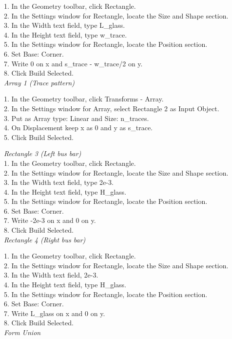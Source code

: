 1. In the Geometry toolbar, click Rectangle.\\
2. In the Settings window for Rectangle, locate the Size and Shape section.\\
3. In the Width text field, type L\_glass.\\
4. In the Height text field, type w\_trace.\\
5. In the Settings window for Rectangle, locate the Position section.\\
6. Set Base: Corner.\\
7. Write 0 on x and s\_trace - w\_trace/2 on y.\\
8. Click Build Selected.
\\
\textit{Array 1 (Trace pattern)}

1. In the Geometry toolbar, click Transforms - Array.\\
2. In the Settings window for Array, select Rectangle 2 as Input Object.\\
3. Put as Array type: Linear and Size: n\_traces.\\
4. On Displacement keep x as 0 and y as s\_trace.\\
5. Click Build Selected.

\textit{Rectangle 3 (Left bus bar)}
\\
1. In the Geometry toolbar, click Rectangle.\\
2. In the Settings window for Rectangle, locate the Size and Shape section.\\
3. In the Width text field, type 2e-3.\\
4. In the Height text field, type H\_glass.\\
5. In the Settings window for Rectangle, locate the Position section.\\
6. Set Base: Corner.\\
7. Write -2e-3 on x and 0 on y.\\
8. Click Build Selected.
\\
\textit{Rectangle 4 (Right bus bar)}

1. In the Geometry toolbar, click Rectangle.\\
2. In the Settings window for Rectangle, locate the Size and Shape section.\\
3. In the Width text field, 2e-3.\\
4. In the Height text field, type H\_glass.\\
5. In the Settings window for Rectangle, locate the Position section.\\
6. Set Base: Corner.\\
7. Write L\_glass on x and 0 on y.\\
8. Click Build Selected.
\\
\textit{Form Union}

